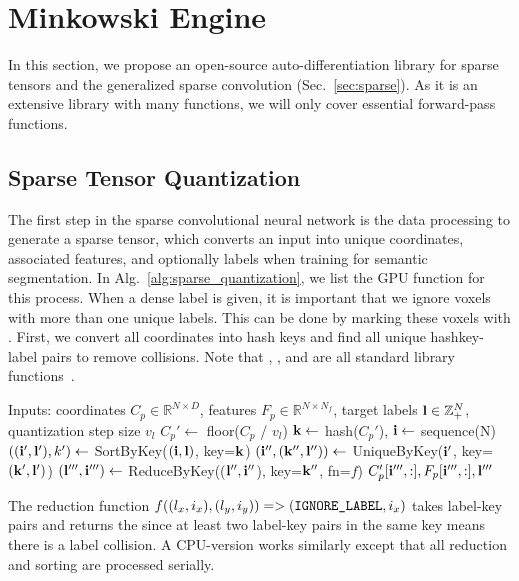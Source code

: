 \section{Minkowski Engine}
\label{sec:minkowskiengine}

In this section, we propose an open-source auto-differentiation library for sparse tensors and the generalized sparse convolution (Sec.~\ref{sec:sparse}). As it is an extensive library with many functions, we will only cover essential forward-pass functions.

\subsection{Sparse Tensor Quantization}
The first step in the sparse convolutional neural network is the data processing to generate a sparse tensor, which converts an input into unique coordinates, associated features, and optionally labels when training for semantic segmentation. In Alg.~\ref{alg:sparse_quantization}, we list the GPU function for this process. When a dense label is given, it is important that we ignore voxels with more than one unique labels. This can be done by marking these voxels with . First, we convert all coordinates into hash keys and find all unique hashkey-label pairs to remove collisions. Note that , , and  are all standard  library functions~\cite{thrust}.
\begin{algorithm}[h]
  \caption{GPU Sparse Tensor Quantization}
  \label{alg:sparse_quantization}
\begin{algorithmic}
		\State Inputs: coordinates $C_p  \in \mathbb{R}^{N \times D}$, features $F_p \in \mathbb{R}^{N \times N_f}$, target labels $\mathbf{l} \in \mathbb{Z}_{+}^N$, quantization step size $v_l$
		\State $C_p'\leftarrow $ floor($C_p$ / $v_l$)
		\State $\mathbf{k} \leftarrow $ hash($C_p'$), $\mathbf{i} \leftarrow$ sequence(N)
		\State $((\mathbf{i}', \mathbf{l}'), k') \leftarrow $ SortByKey($(\mathbf{i}, \mathbf{l})$, key=$\mathbf{k}$)
		\State $(\mathbf{i}'', (\mathbf{k}'', \mathbf{l}'')) \leftarrow $ UniqueByKey($\mathbf{i}'$, key=$(\mathbf{k}', \mathbf{l}')$)
		\State $(\mathbf{l}''', \mathbf{i}''') \leftarrow $ ReduceByKey(($\mathbf{l}'', \mathbf{i}''$), key=$\mathbf{k}''$, fn=$f$)
		\State \Return $C_p'[\mathbf{i}''', :], F_p[\mathbf{i}''', :], \mathbf{l}'''$
\end{algorithmic}
\end{algorithm}
The reduction function $f((l_x, i_x), (l_y, i_y)) => (\code{IGNORE\_LABEL}, i_x)$ takes label-key pairs and returns the  since at least two label-key pairs in the same key means there is a label collision. A CPU-version works similarly except that all reduction and sorting are processed serially.


